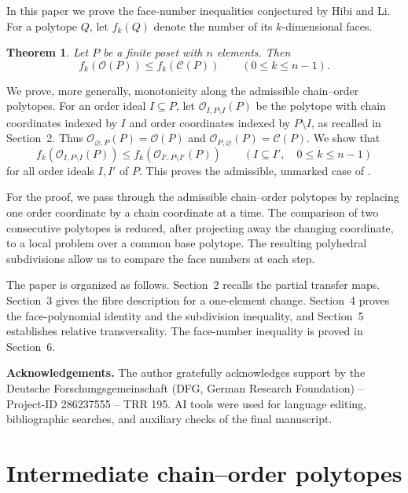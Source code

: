 \documentclass[a4paper,12pt]{amsart}
\newtheorem{theorem}{Theorem}[section]
\theoremstyle{definition}
\theoremstyle{remark}
\newcommand{\OO}{\mathcal O}
\begin{document}
In this paper we prove the face-number inequalities conjectured by Hibi and Li. 
For a polytope $Q$, let $f_k(Q)$ denote the number of its $k$-dimensional faces.
\begin{theorem}\label{thm:face-inequality}
Let $P$ be a finite poset with $n$ elements. Then
\[
 f_k(\mathcal O(P))\leq f_k(\mathcal C(P))  \qquad (0\leq k\leq n-1).
\]
\end{theorem}
We prove, more generally, monotonicity along the admissible chain--order polytopes. 
For an order ideal $I\subseteq P$, let $\OO_{I,P\setminus I}(P)$ be the polytope with chain coordinates indexed by $I$ and order coordinates indexed by $P\setminus I$, as recalled in Section~2. 
Thus $\OO_{\varnothing,P}(P)=\mathcal O(P)$ and $\OO_{P,\varnothing}(P)=\mathcal C(P)$. 
We show that
\[
 f_k(\OO_{I,P\setminus I}(P))\leq f_k(\OO_{I',P\setminus I'}(P))  \qquad  (I\subseteq I',\quad 0\leq k\leq n-1)
\]
for all order ideals $I,I'$ of $P$. 
This proves the admissible, unmarked case of \cite[Conjecture~5.3]{FF16}.

For the proof, we pass through the admissible chain--order polytopes by replacing one order coordinate by a chain coordinate at a time. 
The comparison of two consecutive polytopes is reduced, after projecting away the changing coordinate, to a local problem over a common base polytope. 
The resulting polyhedral subdivisions allow us to compare the face numbers at each step.

The paper is organized as follows. 
Section~2 recalls the partial transfer maps. 
Section~3 gives the fibre description for a one-element change. 
Section~4 proves the face-polynomial identity and the subdivision inequality, and Section~5 establishes relative transversality. 
The face-number inequality is proved in Section~6.

\medskip
\noindent\textbf{Acknowledgements.}
The author gratefully acknowledges support by the Deutsche Forschungsgemeinschaft (DFG, German Research Foundation) -- Project-ID 286237555 -- TRR 195. 
AI tools were used for language editing, bibliographic searches, and auxiliary checks of the final manuscript.


\section{Intermediate chain--order polytopes}\label{sec:intermediate}
\end{document}
